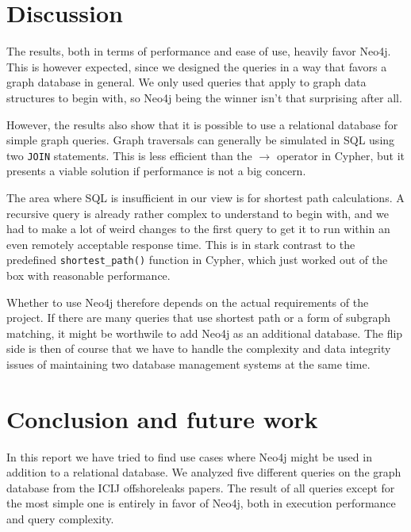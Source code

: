 \documentclass[11pt, a4paper,oneside,chapterprefix=false]{scrbook}
\begin{document}
\chapter{Discussion} \label{chp:discussion}

The results, both in terms of performance and ease of use, heavily favor Neo4j.
This is however expected, since we designed the queries in a way that favors a graph database in general.
We only used queries that apply to graph data structures to begin with, so Neo4j being the winner isn't that surprising after all.

However, the results also show that it is possible to use a relational database for simple graph queries.
Graph traversals can generally be simulated in SQL using two \lstinline{JOIN} statements.
This is less efficient than the $\rightarrow$ operator in Cypher, but it presents a viable solution if performance is not a big concern.

The area where SQL is insufficient in our view is for shortest path calculations.
A recursive query is already rather complex to understand to begin with, and we had to make a lot of weird changes to the first query to get it to run within an even remotely acceptable response time.
This is in stark contrast to the predefined \lstinline{shortest_path()} function in Cypher, which just worked out of the box with reasonable performance.

Whether to use Neo4j therefore depends on the actual requirements of the project.
If there are many queries that use shortest path or a form of subgraph matching, it might be worthwile to add Neo4j as an additional database.
The flip side is then of course that we have to handle the complexity and data integrity issues of maintaining two database management systems at the same time.

\chapter{Conclusion and future work} \label{chp:conclusion}

In this report we have tried to find use cases where Neo4j might be used in addition to a relational database.
We analyzed five different queries on the graph database from the ICIJ offshoreleaks papers.
The result of all queries except for the most simple one is entirely in favor of Neo4j, both in execution performance and query complexity.
\end{document}
